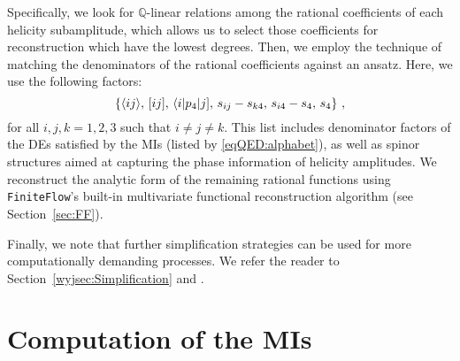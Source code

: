 \documentclass[main.tex]{subfiles}
\begin{document}
Specifically, we look for $\mathbb{Q}$-linear relations among the rational
coefficients of each helicity subamplitude, which allows us to select those coefficients for reconstruction which have the lowest degrees. Then, we employ the technique of matching the denominators of the rational coefficients against an ansatz. Here, we use the following factors:
\begin{equation}
	\left\{\langle ij \rangle , \, [ ij ] , \, \langle i|p_4|j] , \, s_{ij} - s_{k4} , \, s_{i4} - s_4 , \, s_4 \right\} \,,
\end{equation}
for all $i, j, k = 1, 2, 3$ such that $i\neq j \neq k$. This list includes denominator factors of the DEs satisfied by the MIs (listed by \cref{eqQED:alphabet}), 
as well as spinor structures aimed at capturing the phase information of helicity amplitudes.
We reconstruct the analytic form of the remaining rational functions using \texttt{FiniteFlow}'s built-in multivariate functional reconstruction algorithm (see Section~\ref{sec:FF}).

Finally, we note that further simplification strategies can be used for more computationally demanding processes. We refer the reader to Section~\ref{wyjsec:Simplification} and .

\section{Computation of the \aclp{MI}}
\label{secQED:spec-fns}
\end{document}
